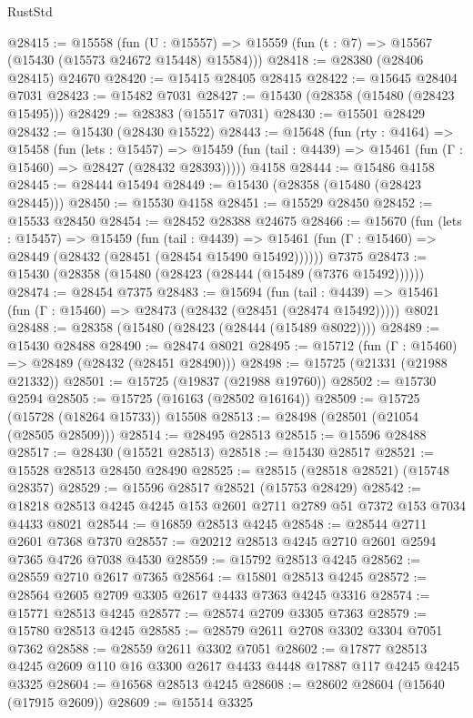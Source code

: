 \begin{lexlean}{RustStd}
\begin{coremodule}
{\begin{coremodule}
{{{{{{{{{{{{{{{{{{{{{{{{{{{{{{{{{{{{{{{{{{{{{{{{{{{{{{{{{{{{@28415 := @15558
    (fun (U : @15557) => @15559 (fun (t : @7) => @15567 (@15430 (@15573 @24672 @15448) @15584)))
@28418 := @28380 (@28406 @28415) @24670
@28420 := @15415 @28405 @28415
@28422 := @15645 @28404 @7031
@28423 := @15482 @7031
@28427 := @15430 (@28358 (@15480 (@28423 @15495)))
@28429 := @28383 (@15517 @7031)
@28430 := @15501 @28429
@28432 := @15430 (@28430 @15522)
@28443 := @15648
    (fun (rty : @4164) =>
    @15458
      (fun (lets : @15457) =>
      @15459 (fun (tail : @4439) => @15461 (fun (Γ : @15460) => @28427 (@28432 @28393)))))
    @4158
@28444 := @15486 @4158
@28445 := @28444 @15494
@28449 := @15430 (@28358 (@15480 (@28423 @28445)))
@28450 := @15530 @4158
@28451 := @15529 @28450
@28452 := @15533 @28450
@28454 := @28452 @28388 @24675
@28466 := @15670
    (fun (lets : @15457) =>
    @15459
      (fun (tail : @4439) =>
      @15461 (fun (Γ : @15460) => @28449 (@28432 (@28451 (@28454 @15490 @15492))))))
    @7375
@28473 := @15430 (@28358 (@15480 (@28423 (@28444 (@15489 (@7376 @15492))))))
@28474 := @28454 @7375
@28483 := @15694
    (fun (tail : @4439) => @15461 (fun (Γ : @15460) => @28473 (@28432 (@28451 (@28474 @15492)))))
    @8021
@28488 := @28358 (@15480 (@28423 (@28444 (@15489 @8022))))
@28489 := @15430 @28488
@28490 := @28474 @8021
@28495 := @15712 (fun (Γ : @15460) => @28489 (@28432 (@28451 @28490)))
@28498 := @15725 (@21331 (@21988 @21332))
@28501 := @15725 (@19837 (@21988 @19760))
@28502 := @15730 @2594
@28505 := @15725 (@16163 (@28502 @16164))
@28509 := @15725 (@15728 (@18264 @15733)) @15508
@28513 := @28498 (@28501 (@21054 (@28505 @28509)))
@28514 := @28495 @28513
@28515 := @15596 @28488
@28517 := @28430 (@15521 @28513)
@28518 := @15430 @28517
@28521 := @15528 @28513 @28450 @28490
@28525 := @28515 (@28518 @28521) (@15748 @28357)
@28529 := @15596 @28517 @28521 (@15753 @28429)
@28542 := @18218 @28513 @4245 @4245 @153 @2601 @2711 @2789 @51 @7372 @153 @7034 @4433 @8021
@28544 := @16859 @28513 @4245
@28548 := @28544 @2711 @2601 @7368 @7370
@28557 := @20212 @28513 @4245 @2710 @2601 @2594 @7365 @4726 @7038 @4530
@28559 := @15792 @28513 @4245
@28562 := @28559 @2710 @2617 @7365
@28564 := @15801 @28513 @4245
@28572 := @28564 @2605 @2709 @3305 @2617 @4433 @7363 @4245 @3316
@28574 := @15771 @28513 @4245
@28577 := @28574 @2709 @3305 @7363
@28579 := @15780 @28513 @4245
@28585 := @28579 @2611 @2708 @3302 @3304 @7051 @7362
@28588 := @28559 @2611 @3302 @7051
@28602 := @17877 @28513 @4245 @2609 @110 @16 @3300 @2617 @4433 @4448 @17887 @117 @4245 @4245 @3325
@28604 := @16568 @28513 @4245
@28608 := @28602 @28604 (@15640 (@17915 @2609))
@28609 := @15514 @3325
}}}}}}}}}}}}}}}}}}}}}}}}}}}}}}}}}}}}}}}}}}}}}}}}}}}}}}}}}}}}
\end{coremodule}}
\end{coremodule}
\end{lexlean}
